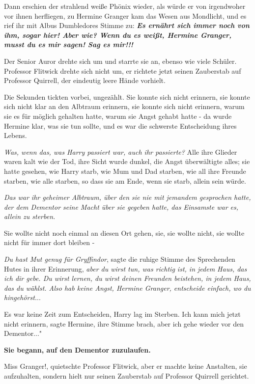 Dann erschien der strahlend weiße Phönix wieder, als würde er von irgendwoher
vor ihnen herfliegen, zu Hermine Granger kam das Wesen aus Mondlicht, und es
rief ihr mit Albus Dumbledores Stimme zu: \textbf{\emph{ \glqq{}Es ernährt sich
immer noch von ihm, sogar hier! Aber wie? Wenn du es weißt, Hermine Granger,
musst du es mir sagen! Sag es mir!!!\grqq{}}}

Der Senior Auror drehte sich um und starrte sie an, ebenso wie viele Schüler.
Professor Flitwick drehte sich nicht um, er richtete jetzt seinen Zauberstab auf
Professor Quirrell, der eindeutig leere Hände vorhielt.

Die Sekunden tickten vorbei, ungezählt. Sie konnte sich nicht erinnern, sie
konnte sich nicht klar an den Albtraum erinnern, sie konnte sich nicht erinnern,
warum sie es für möglich gehalten hatte, warum sie Angst gehabt hatte - da wurde
Hermine klar, was sie tun sollte, und es war die schwerste Entscheidung ihres
Lebens.

\emph{Was, wenn das, was Harry passiert war, auch ihr passierte?}
Alle ihre Glieder waren kalt wie der Tod, ihre Sicht wurde dunkel, die Angst
überwältigte alles; sie hatte gesehen, wie Harry starb, wie Mum und Dad starben,
wie all ihre Freunde starben, wie alle starben, so dass sie am Ende, wenn sie
starb, allein sein würde.

\emph{Das war ihr geheimer Albtraum, über den sie nie mit jemandem gesprochen
hatte, der dem Dementor seine Macht über sie gegeben hatte, das Einsamste war
es, allein zu sterben.}

Sie wollte nicht noch einmal an diesen Ort gehen, sie, sie wollte nicht, sie
wollte nicht für immer dort bleiben -

\emph{Du hast Mut genug für Gryffindor}, sagte die ruhige Stimme des Sprechenden
Hutes in ihrer Erinnerung, \emph{aber du wirst tun, was richtig ist, in jedem
Haus, das ich dir gebe. Du wirst lernen, du wirst deinen Freunden beistehen, in
jedem Haus, das du wählst. Also hab keine Angst, Hermine Granger, entscheide
einfach, wo du hingehörst.}..

Es war keine Zeit zum Entscheiden, Harry lag im Sterben. \glqq{}Ich kann mich
jetzt nicht erinnern\grqq{}, sagte Hermine, ihre Stimme brach, \glqq{}aber ich
gehe wieder vor den Dementor..."

\textbf{ Sie begann, auf den Dementor zuzulaufen.}

\glqq{}Miss Granger!\grqq{}, quietschte Professor Flitwick, aber er machte keine
Anstalten, sie aufzuhalten, sondern hielt nur seinen Zauberstab auf Professor
Quirrell gerichtet.

